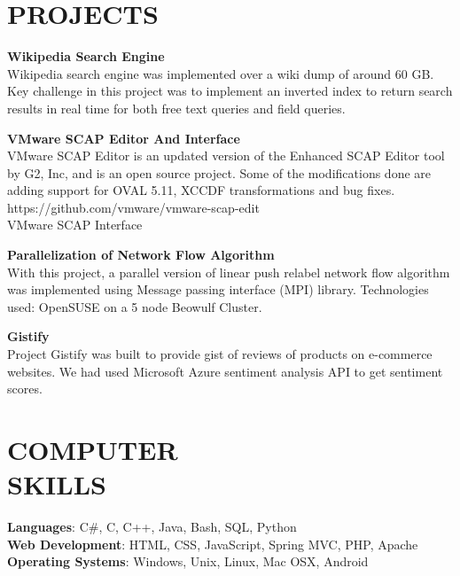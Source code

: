 \documentclass[2pt]{res}
\begin{document}
\begin{resume}
\section{PROJECTS}
\par
\textbf{Wikipedia Search Engine}\\
Wikipedia search engine was implemented over a wiki dump of around 60 GB. Key challenge in this project was to implement an inverted index to return search results in real time
for both free text queries and field queries.
\par
\textbf{VMware SCAP Editor And Interface}\\
VMware SCAP Editor is an updated version of the Enhanced SCAP Editor tool by G2, Inc, and is an open source project. Some of the modifications done are adding support for OVAL 5.11, XCCDF transformations and bug fixes.\\
https://github.com/vmware/vmware-scap-edit\\
VMware SCAP Interface 
\par
\textbf{Parallelization of Network Flow Algorithm  }\\ 
With this project, a parallel version of linear push relabel network flow algorithm was implemented using Message passing
interface (MPI) library. Technologies used: OpenSUSE on a 5 node Beowulf Cluster.
\par
\textbf{Gistify}\\
Project Gistify was built to provide gist of reviews of products on e-commerce websites. We had used Microsoft Azure sentiment analysis API to get sentiment scores.


\section{COMPUTER\\SKILLS}

\textbf{Languages}: C\#, C, C++, Java, Bash, SQL, Python
\\
\textbf{Web Development}: HTML, CSS, JavaScript, Spring MVC, PHP, Apache
\\
\textbf{Operating Systems}: Windows, Unix, Linux, Mac OSX, Android


\end{resume}
\end{document}
